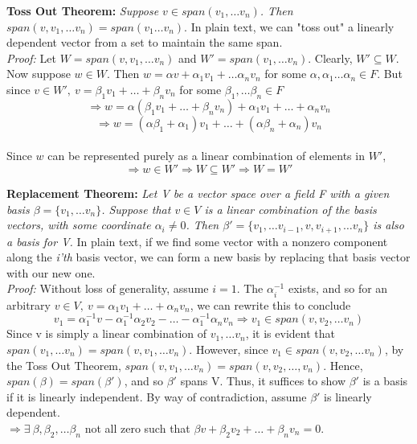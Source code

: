\documentclass[12pt]{article}
\begin{document}
\textbf{Toss Out Theorem: }\emph{Suppose $v \in span(v_1,\dots v_n)$. Then $span(v, v_1,\dots v_n) = span(v_1 \dots v_n)$}. In plain text, we can "toss out" a linearly dependent vector from a set to maintain the same span.\\

\emph{Proof: }Let $W = span(v, v_1,\dots v_n)$ and $W' = span(v_1,\dots v_n)$. Clearly, $W' \subseteq W$. Now suppose $w \in W$. Then $w = \alpha v + \alpha_1 v_1 + \dots \alpha_n v_n$ for some $\alpha, \alpha_1 \dots \alpha_n \in F$. But since $v \in W',\ v = \beta_1 v_1 + \dots + \beta_n v_n$ for some $\beta_1,\dots \beta_n \in F$
$$\Rightarrow w = \alpha (\beta_1 v_1 + \dots + \beta_n v_n) + \alpha_1 v_1 + \dots + \alpha_n v_n$$
$$\Rightarrow w = (\alpha \beta_1 + \alpha_1) v_1 + \dots + (\alpha \beta_n + \alpha_n) v_n$$\\
Since $w$ can be represented purely as a linear combination of elements in $W'$, $$\Rightarrow w \in W' \Rightarrow W \subseteq W' \Rightarrow W = W'$$

\textbf{Replacement Theorem: }\emph{Let V be a vector space over a field F with a given basis $\beta = \{ v_1,\dots v_n \}$. Suppose that $v \in V$ is a linear combination of the basis vectors, with some coordinate $\alpha_i \neq 0$. Then $\beta ' = \{ v_1,\dots v_{i - 1}, v, v_{i + 1},\dots v_n \}$ is also a basis for V.} In plain text, if we find some vector with a nonzero component along the \emph{i'th} basis vector, we can form a new basis by replacing that basis vector with our new one.\\

\emph{Proof: }Without loss of generality, assume $i = 1$. The $\alpha_i^{-1}$ exists, and so for an arbitrary $v \in V,\ v = \alpha_1 v_1 + \dots + \alpha_n v_n$, we can rewrite this to conclude $$v_1 = \alpha_1^{-1} v - \alpha_1^{-1} \alpha_2 v_2 - \dots - \alpha_1^{-1} \alpha_n v_n \Rightarrow v_1 \in span(v, v_2,\dots v_n)$$
Since v is simply a linear combination of $v_1, \dots v_n$, it is evident that $span(v_1,\dots v_n) = span(v, v_1, \dots v_n).$ However, since $v_1 \in span(v,v_2,\dots v_n)$, by the Toss Out Theorem, $span(v, v_1, \dots v_n) = span(v,v_2,\dots, v_n)$. Hence, $span(\beta) = span(\beta')$, and so $\beta'$ spans V. Thus, it suffices to show $\beta'$ is a basis if it is linearly independent. By way of contradiction, assume $\beta'$ is linearly dependent.\\
$\Rightarrow \exists\ \beta, \beta_2, \dots \beta_n $ not all zero such that $\beta v + \beta_2 v_2 + \dots + \beta_n v_n = 0$.\\
\end{document}
